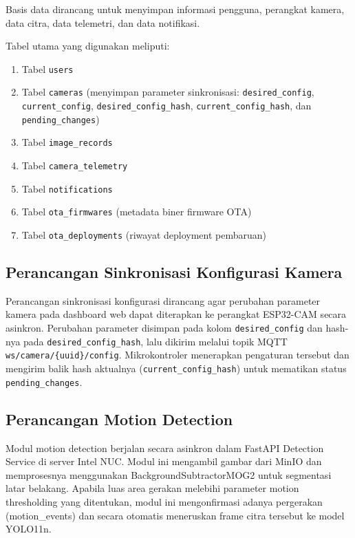 Basis data dirancang untuk menyimpan informasi pengguna, perangkat kamera, data citra, data telemetri, dan data notifikasi.

Tabel utama yang digunakan meliputi:

\begin{enumerate}
	\item Tabel \texttt{users}
	\item Tabel \texttt{cameras} (menyimpan parameter sinkronisasi: \texttt{desired\_config}, \texttt{current\_config}, \texttt{desired\_config\_hash}, \texttt{current\_config\_hash}, dan \texttt{pending\_changes})
	\item Tabel \texttt{image\_records}
	\item Tabel \texttt{camera\_telemetry}
	\item Tabel \texttt{notifications}
	\item Tabel \texttt{ota\_firmwares} (metadata biner firmware OTA)
	\item Tabel \texttt{ota\_deployments} (riwayat deployment pembaruan)
\end{enumerate}

\subsection{Perancangan Sinkronisasi Konfigurasi Kamera}

Perancangan sinkronisasi konfigurasi dirancang agar perubahan parameter kamera pada dashboard web dapat diterapkan ke perangkat ESP32-CAM secara asinkron. Perubahan parameter disimpan pada kolom \texttt{desired\_config} dan hash-nya pada \texttt{desired\_config\_hash}, lalu dikirim melalui topik MQTT \texttt{ws/camera/\{uuid\}/config}. Mikrokontroler menerapkan pengaturan tersebut dan mengirim balik hash aktualnya (\texttt{current\_config\_hash}) untuk mematikan status \texttt{pending\_changes}.

\subsection{Perancangan Motion Detection}

Modul motion detection berjalan secara asinkron dalam FastAPI Detection Service di server Intel NUC. Modul ini mengambil gambar dari MinIO dan memprosesnya menggunakan BackgroundSubtractorMOG2 untuk segmentasi latar belakang. Apabila luas area gerakan melebihi parameter motion thresholding yang ditentukan, modul ini mengonfirmasi adanya pergerakan (motion\_events) dan secara otomatis meneruskan frame citra tersebut ke model YOLO11n.

